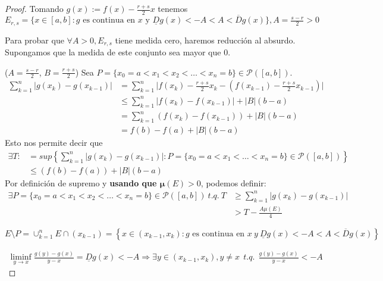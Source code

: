 \begin{proof}
    Tomando $g(x) := f(x) - \frac{r+s}{2}x$ tenemos $E_{r,s} = \{ x \in [a, b] : g \text{ es continua en } x \text{ y } \underline{D} g(x) < - A < A < \overline{D} g(x) \}, A = \frac{s-r}{2} > 0$

    Para probar que $\forall A > 0, E_{r,s}$ tiene medida cero, haremos reducción al absurdo. Supongamos que la medida de este conjunto sea mayor que 0.

    ($A = \frac{s-r}{2}$, $B = \frac{r+s}{2}$)
    Sea $P = \{ x_0 = a < x_1 < x_2 < \hdots < x_n = b \} \in \mathcal P([a,b])$.
    \begin{align*}
        \label{}
        \sum^{n}_{k=1} |g(x_k) - g(x_{k-1})| &= \sum^{n}_{k=1} \bigg\lvert  f(x_k) - \frac{r+s}{2}x_k - \left( f(x_{k-1}) - \frac{r+s}{2} x_{k-1} \right) \bigg\rvert \\
                                             &\leq \sum^{n}_{k=1} |f(x_k) - f(x_{k-1}) | + |B| (b-a)  \\
                                             &= \sum^{n}_{k=1}  (f(x_k) - f(x_{k-1})) + |B|(b-a) \\
                                             &= f(b) - f(a) + |B|(b-a)
    \end{align*}
Esto nos permite decir que \begin{align*}
    \exists T :&= sup \left\{ \sum^{n}_{k=1} |g(x_k) - g(x_{k-1})| : P = \{ x_0 = a < x_1 < \hdots < x_n = b \} \in \mathcal P ([a, b]) \right\} \\
    & \leq (f(b) - f(a)) + |B|(b-a)
\end{align*}
Por definición de supremo y \textbf{usando que $\mathbf \mu(E) > 0$}, podemos definir: \begin{align*}
    \label{}
    \exists P = \{ x_0 = a < x_1 < x_2 < \hdots < x_n = b \} \in \mathcal P([a,b]) \ t.q. \ T &\geq \sum^{n}_{k=1} |g(x_k) - g(x_{k-1})| \\
                                                                                     & > T - \frac{A \mu(E)}{4}
\end{align*}

$E \setminus P = \cup_{k=1}^n E \cap (x_{k-1}) = \left\{ x \in (x_{k-1}, x_k) : g \text{ es continua en } x \ y \ \underline{D}g(x) < -A < A < \overline{D}g(x) \right\}$

\begin{align*}
    \label{}
    \liminf_{y \to x} \frac{g(y) - g(x)}{y - x} = \underline{D}g(x) < -A \Rightarrow \exists y \in (x_{k-1}, x_k), y \neq x \ \ t.q. \ \ \frac{g(y) - g(x)}{y-x} < -A
\end{align*}


\end{proof}
